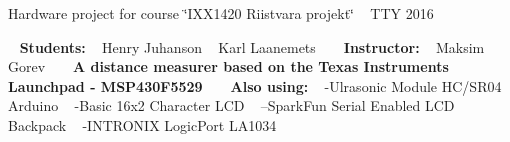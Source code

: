 Hardware project for course \char`\"{}\+I\+X\+X1420 Riistvara projekt\char`\"{} ~\newline
 T\+TY 2016

~\newline
 {\bfseries  Students\+: } ~\newline
 Henry Juhanson ~\newline
 Karl Laanemets ~\newline
~\newline
 {\bfseries Instructor\+:} ~\newline
 Maksim Gorev ~\newline
~\newline
 {\bfseries  A distance measurer based on the Texas Instruments Launchpad -\/ M\+S\+P430\+F5529 } ~\newline
~\newline
 {\bfseries  Also using\+: } ~\newline
 -\/\+Ulrasonic Module H\+C/\+S\+R04 Arduino ~\newline
 -\/\+Basic 16x2 Character L\+CD ~\newline
 --Spark\+Fun Serial Enabled L\+CD Backpack ~\newline
 -\/\+I\+N\+T\+R\+O\+N\+IX Logic\+Port L\+A1034 